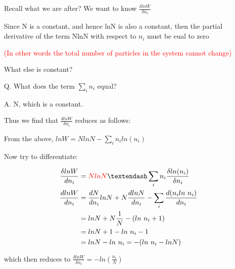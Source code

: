 \documentclass[a4paper,12pt,titlepage]{article}
\begin{document}
\begin{frame}[allowframebreaks]
Recall what we are after? We want to know \(\frac{\delta lnW}{\delta n_i}\)\par\medskip
 
Since N is a constant, and hence lnN is also a constant, then the partial derivative of the  term NlnN with respect to \(n_i\) must be eual to zero\par
\textcolor{red}{(In other words the total number of particles in the system cannot change)}\par\medskip
 
What else is constant?\par
Q. What does the term \(\sum_i n_i \) equal?\par
A. N, which is a constant.\par\medskip

Thus we find that \(\frac{\delta lnW}{\delta n_i}\) reduces as follows:\par\medskip

From the above, \(lnW = NlnN - \sum_i n_i ln(n_i)\)\par\medskip 
Now try to differentiate:\par\medskip

\begin{align*} \frac{\delta lnW}{dn_i} &= \textcolor{red}{NlnN} – \sum_i n_i \frac{\delta ln(n_i)}{\delta n_i}\\
\frac{dlnW}{dn_i} &= \frac{dN}{dn_i}lnN + N \frac{dlnN}{dn_i} - \sum_i \frac{d(n_iln\ n_i)}{dn_i}\\
&= lnN + N\frac{1}{N} - (ln\ n_i +1)\\
&= lnN + 1 - ln\ n_i - 1\\
&= lnN - ln\ n_i = -(ln\ n_i - lnN)\\
\end{align*}
 
which then reduces to \(\frac{\delta lnW}{\delta n_i}  =  - ln\left(\frac{n_i}{N}\right)\)\par   \medskip

\begin{flushright}\par\medskip
\end{flushright}


\end{frame}
\end{document}
